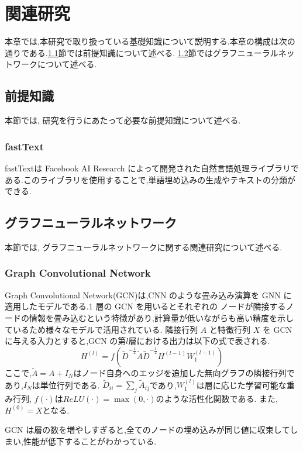\documentclass[a4j,twoside,12pt]{thesis} %
\begin{document}
\addtocounter{chapter}{+1}

\setlength{\baselineskip}{1.95zw}
\setlength{\textheight}{30\baselineskip}
\mainmatter

\fi
%
\newcommand{\argminnnn}{\mathop{\rm arg~min}\limits}
\renewcommand\thefootnote{\arabic{footnote})}
\def\vector#1{\mbox{\boldmath $#1$}}

\chapter{関連研究}\label{rel}
本章では,本研究で取り扱っている基礎知識について説明する.本章の構成は次の通りである.\ref{rel:preKnowledge}節では前提知識について述べる. \ref{rel:GNN}節ではグラフニューラルネットワークについて述べる.

\section{前提知識}\label{rel:preKnowledge}
本節では, 研究を行うにあたって必要な前提知識について述べる.
\subsection{fastText}
fastText\cite{bojanowski2017enriching}は Facebook AI Research によって開発された自然言語処理ライブラリである.このライブラリを使用することで,単語埋め込みの生成やテキストの分類ができる.

\section{グラフニューラルネットワーク}\label{rel:GNN}
本節では, グラフニューラルネットワークに関する関連研究について述べる.

\subsection{Graph Convolutional Network}
Graph Convolutional Network(GCN)は,CNN のような畳み込み演算を GNN に適用したモデルである.1 層の GCN を用いるとそれぞれの
ノードが隣接するノードの情報を畳み込むという特徴があり,計算量が低いながらも高い精度を示しているため様々なモデルで活用されている.
隣接行列 $A$ と特徴行列 $X$ を GCN に与える入力とすると,GCN の第$l$層における出力は以下の式で表される.
\begin{equation}H^{(l)}=f(\tilde{D}^{-\frac{1}{2}}\tilde{A}\tilde{D}^{-\frac{1}{2}}H^{(l-1)}W_{1}^{(l-1)})\end{equation}
ここで,$\tilde{A} = A + I_{N}$はノード自身へのエッジを追加した無向グラフの隣接行列であり,$I_N$は単位行列である.
$\tilde{D}_{ii} = \sum_{j} \tilde{A}_{ij}$であり,$W_{1}^{(l)}$は層に応じた学習可能な重み行列,
$f(\cdot)$は$ReLU(\cdot) = \max (0, \cdot)$のような活性化関数である.
また,$H^{(0)}=X$となる.\par
GCN は層の数を増やしすぎると,全てのノードの埋め込みが同じ値に収束してしまい,性能が低下することがわかっている.
\end{document}
